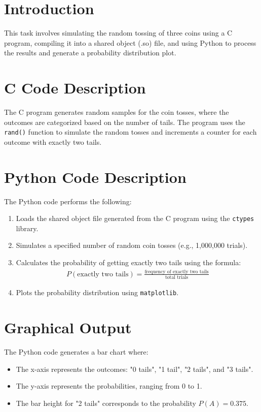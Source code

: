 \documentclass[journal]{IEEEtran}
\begin{document}
\section*{Introduction}
This task involves simulating the random tossing of three coins using a C program, compiling it into a shared object (.so) file, and using Python to process the results and generate a probability distribution plot.

\section*{C Code Description}
The C program generates random samples for the coin tosses, where the outcomes are categorized based on the number of tails. The program uses the \texttt{rand()} function to simulate the random tosses and increments a counter for each outcome with exactly two tails.

\section*{Python Code Description}
The Python code performs the following:
\begin{enumerate}
    \item Loads the shared object file generated from the C program using the \texttt{ctypes} library.
    \item Simulates a specified number of random coin tosses (e.g., 1,000,000 trials).
    \item Calculates the probability of getting exactly two tails using the formula:
    \begin{align}
    P(\text{exactly two tails}) = \frac{\text{frequency of exactly two tails}}{\text{total trials}}
    \end{align}
    \item Plots the probability distribution using \texttt{matplotlib}.
\end{enumerate}

\section*{Graphical Output}
The Python code generates a bar chart where:
\begin{itemize}
    \item The x-axis represents the outcomes: "0 tails", "1 tail", "2 tails", and "3 tails".
    \item The y-axis represents the probabilities, ranging from 0 to 1.
    \item The bar height for "2 tails" corresponds to the probability $P(A) = 0.375$.
\end{itemize}
\end{document}
